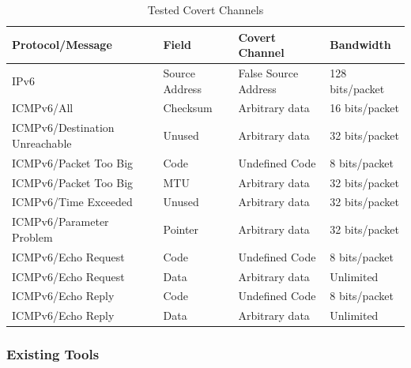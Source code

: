 \documentclass[12pt]{article}
\begin{document}
\begin{savenotes}
\begin{table}[h]
\centering
\begin{tabular}{|C{4.5cm}|C{3.0cm}|C{3.5cm}|C{3.0cm}|}
\hline
Protocol/Message&Field&Covert Channel&Bandwidth\\
\hline
IPv6&Source Address&False Source Address&128 bits/packet\\
\hline
ICMPv6/All&Checksum&Arbitrary data&16 bits/packet\\
\hline
ICMPv6/Destination Unreachable&Unused&Arbitrary data&32 bits/packet\\
\hline
ICMPv6/Packet Too Big&Code&Undefined Code&8 bits/packet\\
\hline
ICMPv6/Packet Too Big&MTU&Arbitrary data&32 bits/packet\\
\hline
ICMPv6/Time Exceeded&Unused&Arbitrary data&32 bits/packet\\
\hline
ICMPv6/Parameter Problem&Pointer&Arbitrary data&32 bits/packet\\
\hline
ICMPv6/Echo Request&Code&Undefined Code&8 bits/packet\\
\hline
ICMPv6/Echo Request&Data&Arbitrary data&Unlimited\\
\hline
ICMPv6/Echo Reply&Code&Undefined Code&8 bits/packet\\
\hline
ICMPv6/Echo Reply&Data&Arbitrary data&Unlimited\\
\hline
\end{tabular}
\caption{Tested Covert Channels}
\label{table:testedCC}
\end{table}
\end{savenotes}

\subsubsection{Existing Tools}
\label{subsub:tools}
\end{document}
